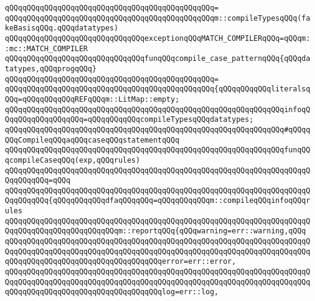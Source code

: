 \verb|qQQqqQQqqQQqqQQqqQQqqQQqqQQqqQQqqQQqqQQqqQQqqQQq=|\newline
\verb|qQQqqQQqqQQqqQQqqQQqqQQqqQQqqQQqqQQqqQQqqQQqqQQqm::compileTypesqQQq(fakeBasisqQQq.qQQqdatatypes)|\newline
\newline
\verb|qQQqqQQqqQQqqQQqqQQqqQQqqQQqqQQqexceptionqQQqMATCH_COMPILERqQQq=qQQqm::mc::MATCH_COMPILER|\newline
\newline
\verb|qQQqqQQqqQQqqQQqqQQqqQQqqQQqqQQqfunqQQqcompile_case_patternqQQq{qQQqdatatypes,qQQqprogqQQq}|\newline
\verb|qQQqqQQqqQQqqQQqqQQqqQQqqQQqqQQqqQQqqQQqqQQqqQQq=|\newline
\verb|qQQqqQQqqQQqqQQqqQQqqQQqqQQqqQQqqQQqqQQqqQQqqQQq{qQQqqQQqqQQqliteralsqQQq=qQQqqQQqqQQqREFqQQqm::LitMap::empty;|\newline
\verb|qQQqqQQqqQQqqQQqqQQqqQQqqQQqqQQqqQQqqQQqqQQqqQQqqQQqqQQqqQQqqQQqinfoqQQqqQQqqQQqqQQqqQQq=qQQqqQQqqQQqcompileTypesqQQqdatatypes;|\newline
\newline
\verb|qQQqqQQqqQQqqQQqqQQqqQQqqQQqqQQqqQQqqQQqqQQqqQQqqQQqqQQqqQQqqQQq#qQQqqQQqCompileqQQqaqQQqcaseqQQqstatementqQQq|\newline
\newline
\verb|qQQqqQQqqQQqqQQqqQQqqQQqqQQqqQQqqQQqqQQqqQQqqQQqqQQqqQQqqQQqqQQqfunqQQqcompileCaseqQQq(exp,qQQqrules)|\newline
\verb|qQQqqQQqqQQqqQQqqQQqqQQqqQQqqQQqqQQqqQQqqQQqqQQqqQQqqQQqqQQqqQQqqQQqqQQqqQQqqQQq=qQQq|\newline
\verb|qQQqqQQqqQQqqQQqqQQqqQQqqQQqqQQqqQQqqQQqqQQqqQQqqQQqqQQqqQQqqQQqqQQqqQQqqQQqqQQq{qQQqqQQqqQQqdfaqQQqqQQq=qQQqqQQqqQQqm::compileqQQqinfoqQQqrules|\newline
\newline
\verb|qQQqqQQqqQQqqQQqqQQqqQQqqQQqqQQqqQQqqQQqqQQqqQQqqQQqqQQqqQQqqQQqqQQqqQQqqQQqqQQqqQQqqQQqqQQqqQQqm::reportqQQq{qQQqwarning=err::warning,qQQq|\newline
\verb|qQQqqQQqqQQqqQQqqQQqqQQqqQQqqQQqqQQqqQQqqQQqqQQqqQQqqQQqqQQqqQQqqQQqqQQqqQQqqQQqqQQqqQQqqQQqqQQqqQQqqQQqqQQqqQQqqQQqqQQqqQQqqQQqqQQqqQQqqQQqqQQqqQQqqQQqqQQqqQQqqQQqqQQqqQQqqQQqerror=err::error,|\newline
\verb|qQQqqQQqqQQqqQQqqQQqqQQqqQQqqQQqqQQqqQQqqQQqqQQqqQQqqQQqqQQqqQQqqQQqqQQqqQQqqQQqqQQqqQQqqQQqqQQqqQQqqQQqqQQqqQQqqQQqqQQqqQQqqQQqqQQqqQQqqQQqqQQqqQQqqQQqqQQqqQQqqQQqqQQqqQQqqQQqlog=err::log,|\newline
